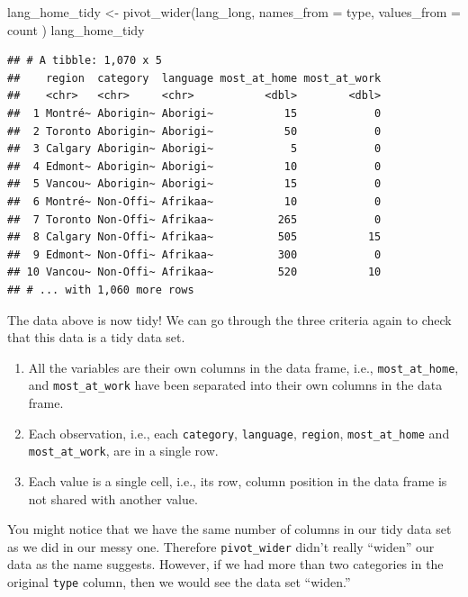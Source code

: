 \documentclass[
]{krantz}
\makeatletter
\newenvironment{Shaded}{\begin{snugshade}}{\end{snugshade}}
\newcommand{\AttributeTok}[1]{\textcolor[rgb]{0.61,0.61,0.61}{#1}}
\newcommand{\FunctionTok}[1]{\textcolor[rgb]{0,0,0}{#1}}
\newcommand{\NormalTok}[1]{#1}
\newcommand{\OtherTok}[1]{\textcolor[rgb]{0.37,0.37,0.37}{#1}}
\providecommand{\tightlist}{%
  \setlength{\itemsep}{0pt}\setlength{\parskip}{0pt}}
\newenvironment{kframe}{%
\medskip{}
\setlength{\fboxsep}{.8em}
 \def\at@end@of@kframe{}%
 \ifinner\ifhmode%
  \def\at@end@of@kframe{\end{minipage}}%
  \begin{minipage}{\columnwidth}%
 \fi\fi%
 \def\FrameCommand##1{\hskip\@totalleftmargin \hskip-\fboxsep
 \colorbox{shadecolor}{##1}\hskip-\fboxsep
     \hskip-\linewidth \hskip-\@totalleftmargin \hskip\columnwidth}%
 \MakeFramed {\advance\hsize-\width
   \@totalleftmargin\z@ \linewidth\hsize
   \@setminipage}}%
 {\par\unskip\endMakeFramed%
 \at@end@of@kframe}
\renewenvironment{Shaded}{\begin{kframe}}{\end{kframe}}
\makeatother
\begin{document}
\begin{Shaded}
\begin{Highlighting}[]
\NormalTok{lang\_home\_tidy }\OtherTok{\textless{}{-}} \FunctionTok{pivot\_wider}\NormalTok{(lang\_long,}
  \AttributeTok{names\_from =}\NormalTok{ type,}
  \AttributeTok{values\_from =}\NormalTok{ count}
\NormalTok{)}
\NormalTok{lang\_home\_tidy}
\end{Highlighting}
\end{Shaded}

\begin{verbatim}
## # A tibble: 1,070 x 5
##    region  category  language most_at_home most_at_work
##    <chr>   <chr>     <chr>           <dbl>        <dbl>
##  1 Montré~ Aborigin~ Aborigi~           15            0
##  2 Toronto Aborigin~ Aborigi~           50            0
##  3 Calgary Aborigin~ Aborigi~            5            0
##  4 Edmont~ Aborigin~ Aborigi~           10            0
##  5 Vancou~ Aborigin~ Aborigi~           15            0
##  6 Montré~ Non-Offi~ Afrikaa~           10            0
##  7 Toronto Non-Offi~ Afrikaa~          265            0
##  8 Calgary Non-Offi~ Afrikaa~          505           15
##  9 Edmont~ Non-Offi~ Afrikaa~          300            0
## 10 Vancou~ Non-Offi~ Afrikaa~          520           10
## # ... with 1,060 more rows
\end{verbatim}

The data above is now tidy! We can go through the three criteria again to check that this data is a tidy data set.

\begin{enumerate}
\def\labelenumi{\arabic{enumi}.}
\tightlist
\item
  All the variables are their own columns in the data frame, i.e., \texttt{most\_at\_home}, and \texttt{most\_at\_work} have been separated into their own columns in the data frame.
\item
  Each observation, i.e., each \texttt{category}, \texttt{language}, \texttt{region}, \texttt{most\_at\_home} and \texttt{most\_at\_work}, are in a single row.
\item
  Each value is a single cell, i.e., its row, column position in the data frame is not shared with another value.
\end{enumerate}

You might notice that we have the same number of columns in our tidy data set as we did in our messy one. Therefore \texttt{pivot\_wider} didn't really ``widen'' our data as the name suggests. However, if we had more than two categories in the original \texttt{type} column, then we would see the data set ``widen.''
\end{document}
